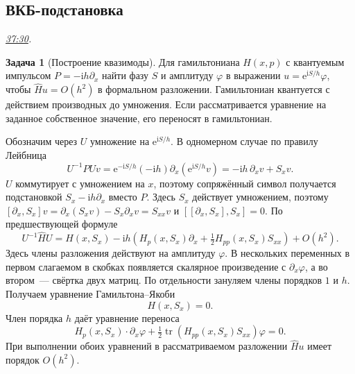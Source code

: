 \documentclass[11pt,a4paper]{article}
\theoremstyle{plain}
\theoremstyle{definition}
\newtheorem{exercise}[theorem]{Задача}
\newcommand{\ii}{\mathrm i}
\newcommand{\ee}{\mathrm e}
\DeclareMathOperator{\tr}{tr}
\newcommand{\at}[3]{\href{https://www.youtube.com/watch?v=#1&t=#2s}{#3}}
\newcommand{\topic}[2]{\Needspace{5\baselineskip}\subsection*{#1}\noindent\emph{#2.}\par\nobreak\smallskip}
\begin{document}
\topic{ВКБ-подстановка}{\at{Ks_j6QaMPJ4}{2250}{37:30}}
\begin{exercise}[Построение квазимоды]
Для гамильтониана $H(x,p)$ с квантуемым импульсом
$P=-\ii h\partial_x$ найти фазу $S$ и амплитуду $\varphi$
в выражении $u=\ee^{\ii S/h}\varphi$, чтобы
$\widehat Hu=O(h^2)$ в формальном разложении.
Гамильтониан квантуется с действием производных до
умножения. Если рассматривается уравнение на заданное
собственное значение, его переносят в гамильтониан.
\end{exercise}
Обозначим через $U$ умножение на $\ee^{\ii S/h}$.
В одномерном случае по правилу Лейбница
\[
 U^{-1}PUv
 =\ee^{-\ii S/h}(-\ii h)\partial_x(\ee^{\ii S/h}v)
 =-\ii h\,\partial_xv+S_xv .
\]
$U$ коммутирует с умножением на $x$, поэтому сопряжённый
символ получается подстановкой $S_x-\ii h\partial_x$
вместо $P$. Здесь $S_x$ действует умножением, поэтому
$[\partial_x,S_x]v=\partial_x(S_xv)-S_x\partial_xv=S_{xx}v$
и $[[\partial_x,S_x],S_x]=0$. По предшествующей формуле
\[
 U^{-1}\widehat H U
 =H(x,S_x)-\ii h\left(
    H_p(x,S_x)\partial_x+\tfrac12 H_{pp}(x,S_x)S_{xx}
    \right)+O(h^2).
\]
Здесь члены разложения действуют на амплитуду $\varphi$.
В нескольких переменных в первом слагаемом в скобках
появляется скалярное произведение с $\partial_x\varphi$,
а во втором~--- свёртка двух матриц. По отдельности
зануляем члены порядков $1$ и $h$. Получаем
уравнение Гамильтона--Якоби
\[
 H(x,S_x)=0.
\]
Член порядка $h$ даёт уравнение переноса
\[
 H_p(x,S_x)\cdot\partial_x\varphi+
 \tfrac12\tr\!\left(H_{pp}(x,S_x)S_{xx}\right)\varphi=0 .
\]
При выполнении обоих уравнений в рассматриваемом разложении
$\widehat H u$ имеет порядок $O(h^2)$.
\end{document}
